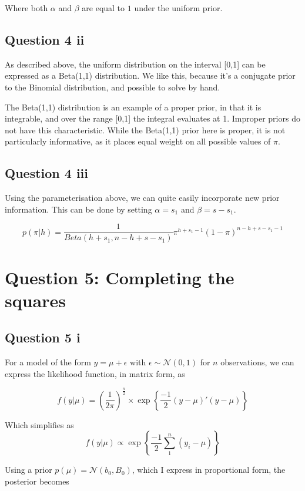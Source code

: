 \documentclass[a4paper,11pt]{article}
\begin{document}
Where both $\alpha$ and $\beta$ are equal to $1$ under the uniform prior.

\subsection*{Question 4 ii}

As described above, the uniform distribution on the interval [0,1] can be expressed as a Beta(1,1) distribution. We like this, because it's a conjugate prior to the Binomial distribution, and possible to solve by hand.

The Beta(1,1) distribution is an example of a proper prior, in that it is integrable, and over the range [0,1] the integral evaluates at 1. Improper priors do not have this characteristic. While the Beta(1,1) prior here is proper, it is not particularly informative, as it places equal weight on all possible values of $\pi$.

\subsection*{Question 4 iii}

Using the parameterisation above, we can quite easily incorporate new prior information. This can be done by setting $\alpha=s_1$ and $\beta=s - s_1$.

\[
p(\pi|h) = \frac{1}{Beta(h + s_{1}, n - h + s - s_{1})} \pi^{h + s_{1}-1} (1-\pi)^{n-h + s - s_{1}-1}
\]


\section*{Question 5: Completing the squares}

\subsection*{Question 5 i}

For a model of the form $y = \mu + \epsilon$ with $\epsilon \sim \mathcal{N}(0, 1)$ for $n$ observations, we can express the likelihood function, in matrix form, as

\[
f(y|\mu) = \left(\frac{1}{2\pi}\right)^{\frac{n}{2}} \times \exp\left\{\frac{-1}{2}(y - \mu)'(y - \mu)\right\}
\]

Which simplifies as
\[
f(y|\mu) \propto \exp\left\{\frac{-1}{2}\sum_{1}^{n}(y_{i}-\mu)\right\}
\]

Using a prior $p(\mu) = \mathcal{N}(b_{0}, B_{0})$, which I express in proportional form, the posterior becomes
\end{document}

